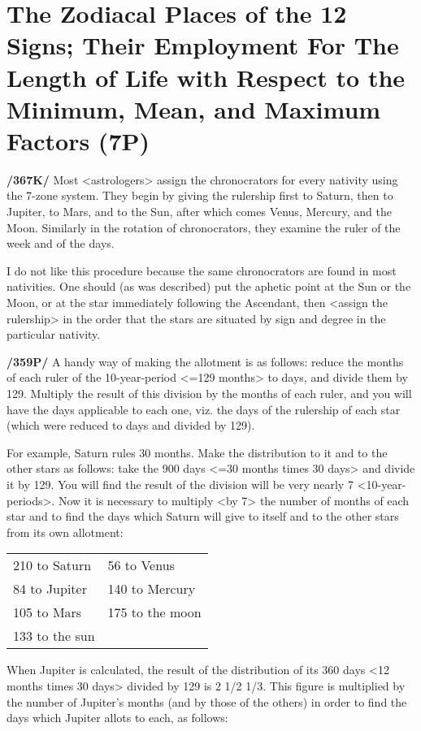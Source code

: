 \section{The Zodiacal Places of the 12 Signs; Their Employment For The Length of Life with Respect to the Minimum, Mean, and Maximum Factors (7P)}

\textbf{/367K/} Most <astrologers> assign the chronocrators for every nativity using the 7-zone system. They begin by giving the rulership first to Saturn, then to Jupiter, to Mars, and to the Sun, after which comes
Venus, Mercury, and the Moon. Similarly in the rotation of chronocrators, they examine the ruler of the week and of the days. 

I do not like this procedure because the same chronocrators are found in most nativities. One should (as was described) put the aphetic point at the Sun or the Moon, or at the star immediately following the Ascendant, then <assign the rulership> in the order that the stars are situated by sign and degree in the particular nativity.

\textbf{/359P/} A handy way of making the allotment is as follows: reduce the months of each ruler of the 10-year-period <=129 months> to days, and divide them by 129. Multiply the result of this division by the months of each ruler, and you will have the days applicable to each one, viz. the days of the rulership of each star (which were reduced to days and divided by 129). 

For example, Saturn rules 30 months. Make the distribution to it and to the other stars as follows: take the 900 days <=30 months times 30 days> and divide it by 129. You will find the result of the division will be very nearly 7 <10-year-periods>. Now it is necessary to multiply <by 7> the number of months of each star and to find the days which Saturn will give to itself and to the other stars from its own allotment:

\begin{tabular}{ll}
210 to Saturn & 56 to Venus \\
84 to Jupiter & 140 to Mercury \\
105 to Mars  & 175 to the moon \\
133 to the sun & \\
\end{tabular}

When Jupiter is calculated, the result of the distribution of its 360 days <12 months times 30 days> divided by 129 is 2 1/2 1/3. This figure is multiplied by the number of Jupiter’s months (and by those of
the others) in order to find the days which Jupiter allots to each, as follows:

